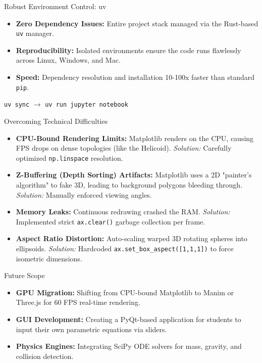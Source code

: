 \documentclass{beamer}
\begin{document}
\begin{frame}{Robust Environment Control: uv}
\begin{itemize}
    \item \textbf{Zero Dependency Issues:} Entire project stack managed via the Rust-based \texttt{uv} manager.
    \item \textbf{Reproducibility:} Isolated environments ensure the code runs flawlessly across Linux, Windows, and Mac.
    \item \textbf{Speed:} Dependency resolution and installation 10-100x faster than standard \texttt{pip}.
\end{itemize}
\vspace{0.3cm}
\centering
\texttt{uv sync} $\rightarrow$ \texttt{uv run jupyter notebook}
\end{frame}
\begin{frame}{Overcoming Technical Difficulties}
\begin{itemize}
    \item \textbf{CPU-Bound Rendering Limits:} Matplotlib renders on the CPU, causing FPS drops on dense topologies (like the Helicoid). \textit{Solution:} Carefully optimized \texttt{np.linspace} resolution.
    \item \textbf{Z-Buffering (Depth Sorting) Artifacts:} Matplotlib uses a 2D "painter's algorithm" to fake 3D, leading to background polygons bleeding through. \textit{Solution:} Manually enforced viewing angles.
    \item \textbf{Memory Leaks:} Continuous redrawing crashed the RAM. \textit{Solution:} Implemented strict \texttt{ax.clear()} garbage collection per frame.
    \item \textbf{Aspect Ratio Distortion:} Auto-scaling warped 3D rotating spheres into ellipsoids. \textit{Solution:} Hardcoded \texttt{ax.set\_box\_aspect([1,1,1])} to force isometric dimensions.
\end{itemize}
\end{frame}
\begin{frame}{Future Scope}
\begin{itemize}
    \item \textbf{GPU Migration:} Shifting from CPU-bound Matplotlib to Manim or Three.js for 60 FPS real-time rendering.
    \item \textbf{GUI Development:} Creating a PyQt-based application for students to input their own parametric equations via sliders.
    \item \textbf{Physics Engines:} Integrating SciPy ODE solvers for mass, gravity, and collision detection.
\end{itemize}
\end{frame}
\end{document}
